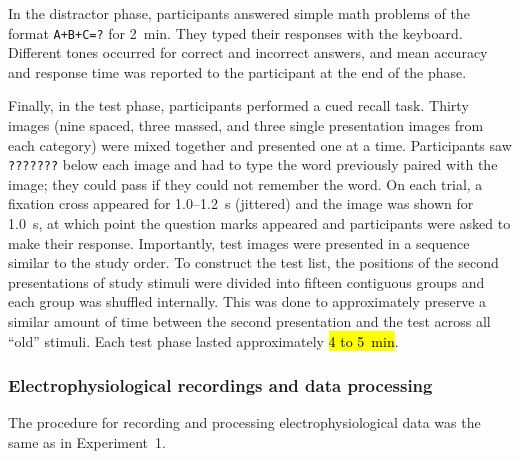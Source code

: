 In the distractor phase, participants answered simple math problems of the format \texttt{A+B+C=?} for 2~min.  They typed their responses with the keyboard.  Different tones occurred for correct and incorrect answers, and mean accuracy and response time was reported to the participant at the end of the phase.


Finally, in the test phase, participants performed a cued recall task.  Thirty images (nine spaced, three massed, and three single presentation images from each category) were mixed together and presented one at a time.  Participants saw \texttt{???????} below each image and had to type the word previously paired with the image; they could pass if they could not remember the word.  On each trial, a fixation cross appeared for 1.0--1.2~s (jittered) and the image was shown for 1.0~s, at which point the question marks appeared and participants were asked to make their response.  Importantly, test images were presented in a sequence similar to the study order.  To construct the test list, the positions of the second presentations of study stimuli were divided into fifteen contiguous groups and each group was shuffled internally.  This was done to approximately preserve a similar amount of time between the second presentation and the test across all ``old'' stimuli.  Each test phase lasted approximately \hl{4 to 5~min}.



\subsubsection{Electrophysiological recordings and data processing}

The procedure for recording and processing electrophysiological data was the same as in Experiment~1.


